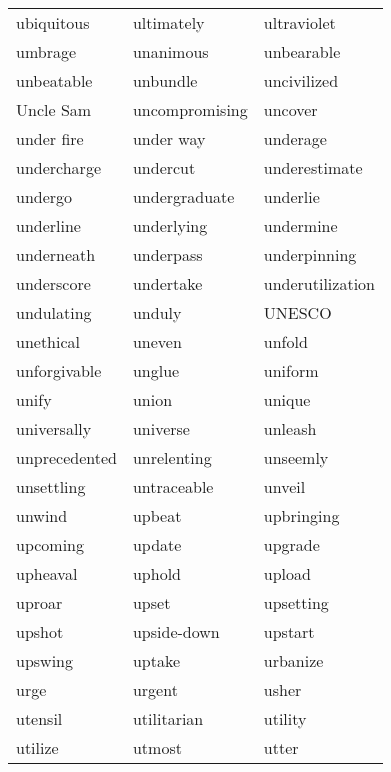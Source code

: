 \documentclass{minimal}
\begin{document}
\begin{longtable}{p{2.7cm}@{\hskip 0.2cm}p{2.7cm}@{\hskip 0.2cm}p{2.7cm}}
ubiquitous & ultimately & ultraviolet \\
umbrage & unanimous & unbearable \\
unbeatable & unbundle & uncivilized \\
Uncle Sam & uncompromising & uncover \\
under fire & under way & underage \\
undercharge & undercut & underestimate \\
undergo & undergraduate & underlie \\
underline & underlying & undermine \\
underneath & underpass & underpinning \\
underscore & undertake & underutilization \\
undulating & unduly & UNESCO \\
unethical & uneven & unfold \\
unforgivable & unglue & uniform \\
unify & union & unique \\
universally & universe & unleash \\
unprecedented & unrelenting & unseemly \\
unsettling & untraceable & unveil \\
unwind & upbeat & upbringing \\
upcoming & update & upgrade \\
upheaval & uphold & upload \\
uproar & upset & upsetting \\
upshot & upside-down & upstart \\
upswing & uptake & urbanize \\
urge & urgent & usher \\
utensil & utilitarian & utility \\
utilize & utmost & utter
\end{longtable}
\end{document}
